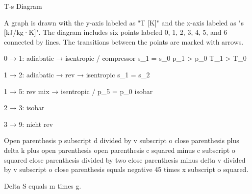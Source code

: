 T-s Diagram  

A graph is drawn with the y-axis labeled as "T [K]" and the x-axis labeled as "s [kJ/kg·K]". The diagram includes six points labeled 0, 1, 2, 3, 4, 5, and 6 connected by lines. The transitions between the points are marked with arrows.  

0 → 1: adiabatic → isentropic / compressor  
s_1 = s_0  
p_1 > p_0  
T_1 > T_0  

1 → 2: adiabatic → rev → isentropic  
s_1 = s_2  

1 → 5: rev mix → isentropic / p_5 = p_0 isobar  

2 → 3: isobar  

3 → 9: nicht rev

Open parenthesis p subscript d divided by v subscript o close parenthesis plus delta k plus open parenthesis open parenthesis c squared minus c subscript o squared close parenthesis divided by two close parenthesis minus delta v divided by v subscript o close parenthesis equals negative 45 times x subscript o squared.  

Delta S equals m times g.